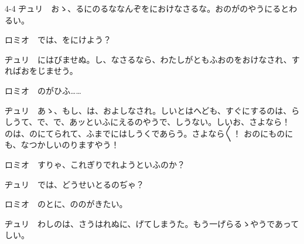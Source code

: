 \documentclass[tate,paper=b6j,jafontsize=9pt]{jlreq}
\begin{document}
\begin{azconvIndented}{4\zw}{-4\zw}
ヂュリ　おゝ、るにのるななんぞをにおけなさるな。おのがのやうにるとわるい。

ロミオ　では、をにけよう？

ヂュリ　にはびませぬ。し、なさるなら、わたしがともふおのをおけなされ、すればおをじませう。

ロミオ　のがひふ……

ヂュリ　あゝ、もし、は、およしなされ。しいとはへども、すぐにするのは、らしうて、で、で、あッといふにえるのやうで、しうない。しいお、さよなら！ のは、のにてられて、ふまでにはしうくであらう。さよなら{〳〵}！ おのにものにも、なつかしいのりますやう！

ロミオ　すりゃ、これぎりでれようといふのか？

ヂュリ　では、どうせいとるのぢゃ？

ロミオ　のとに、ののがきたい。

ヂュリ　わしのは、さうはれぬに、げてしまうた。もう一げらるゝやうであってしい。


\end{azconvIndented}
\end{document}
